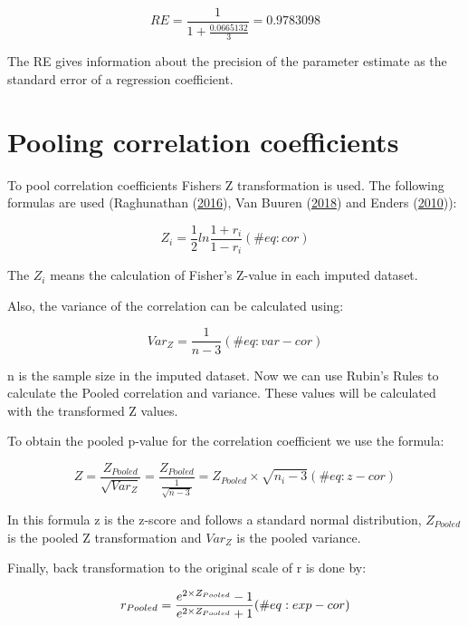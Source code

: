 \documentclass[
]{book}
\begin{document}
\[RE = \frac{1}{1+\frac{0.0665132}{3}}=0.9783098\]

The RE gives information about the precision of the parameter estimate
as the standard error of a regression coefficient.

\hypertarget{pooling-correlation-coefficients-1}{%
\chapter{Pooling correlation
coefficients}\label{pooling-correlation-coefficients-1}}

To pool correlation coefficients Fishers Z transformation is used. The
following formulas are used (Raghunathan
(\protect\hyperlink{ref-raghunathan2016}{2016}), Van Buuren
(\protect\hyperlink{ref-VanBuuren2018}{2018}) and Enders
(\protect\hyperlink{ref-enders2010applied}{2010})):

\begin{equation}
Z_i = \frac{1}{2}ln\frac{1+r_i}{1-r_i}
  (\#eq:cor)
\end{equation}

The \({Z_i}\) means the calculation of Fisher's Z-value in each imputed
dataset.

Also, the variance of the correlation can be calculated using:

\begin{equation}
Var_Z=\frac{1}{n-3}
  (\#eq:var-cor)
\end{equation}

n is the sample size in the imputed dataset. Now we can use Rubin's
Rules to calculate the Pooled correlation and variance. These values
will be calculated with the transformed Z values.

To obtain the pooled p-value for the correlation coefficient we use the
formula:

\begin{equation}
Z=\frac{Z_{Pooled}}{\sqrt{Var_Z}} = \frac{Z_{Pooled}}{\frac{1}{\sqrt{n-3}}}=Z_{Pooled}\times\sqrt{n_i-3}
  (\#eq:z-cor)
\end{equation}

In this formula z is the z-score and follows a standard normal
distribution, \(Z_{Pooled}\) is the pooled Z transformation and
\(Var_Z\) is the pooled variance.

Finally, back transformation to the original scale of r is done by:

\begin{equation}
r_{Pooled} = \frac{e^{2\times\\Z_{Pooled}}-1}{e^{2\times\\Z_{Pooled}}+1}
  (\#eq:exp-cor)
\end{equation}
\end{document}
